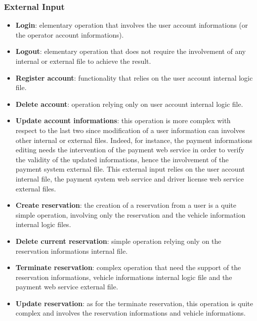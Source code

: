 \subsubsection{External Input}

\begin{itemize}
	\item \textbf{Login}: elementary operation that involves the user account informations (or the operator account informations).

	\item \textbf{Logout}: elementary operation that does not require the involvement of any internal or external file to achieve the result.

	\item \textbf{Register account}: functionality that relies on the user account internal logic file.

	\item \textbf{Delete account}: operation relying only on user account internal logic file.

	\item \textbf{Update account informations}: this operation is more complex with respect to the last two since modification of a user information can involves other internal or external files. Indeed, for instance,
the payment informations editing needs the intervention of the payment web service in order to verify the validity of the updated informations, hence the involvement of the payment system external file.
This external input relies on the user account internal file, the payment system web service and driver license web service external files.

	\item \textbf{Create reservation}: the creation of a reservation from a user is a quite simple operation, involving only the reservation and the vehicle information internal logic files.

	\item \textbf{Delete current reservation}: simple operation relying only on the reservation informations internal file.

	\item \textbf{Terminate reservation}: complex operation that need the support of the reservation informations, vehicle informations internal logic file and the payment web service external file.

	\item \textbf{Update reservation}: as for the terminate reservation, this operation is quite complex and involves the reservation informations and vehicle informations.


\end{itemize}
